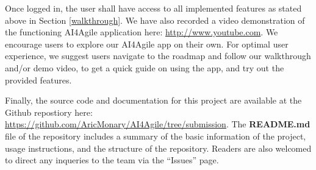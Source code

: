 Once logged in, the user shall have access to all implemented features as stated above in Section \ref{walkthrough}. We have also recorded a video demonstration of the functioning AI4Agile application here: \url{http://www.youtube.com}. We encourage users to explore our AI4Agile app on their own. For optimal user experience, we suggest users navigate to the roadmap and follow our walkthrough and/or demo video, to get a quick guide on using the app, and try out the provided features.

Finally, the source code and documentation for this project are available at the Github repostiory here: \url{https://github.com/AricMonary/AI4Agile/tree/submission}. The \textbf{README.md} file of the repository includes a summary of the basic information of the project, usage instructions, and the structure of the repository. Readers are also welcomed to direct any inqueries to the team via the ``Issues'' page. 
